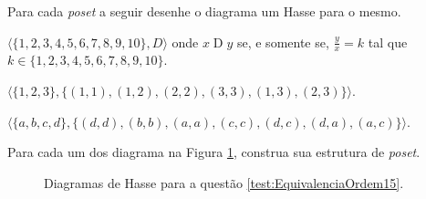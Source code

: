 \begin{questao}\label{test:EquivalenciaOrdem15}
	Para cada \textit{poset} a seguir desenhe o diagrama um Hasse para o mesmo.
\end{questao}

\begin{exerList}
	\item $\langle \{1, 2, 3, 4, 5, 6, 7, 8, 9, 10\}, D\rangle$ onde $x \mathrel{D} y$ se, e somente se, $\displaystyle\frac{y}{x} = k$ tal que $k \in \{1, 2, 3, 4, 5, 6, 7, 8, 9, 10\}$.
	\item $\langle \{1, 2, 3\}, \{(1, 1), (1, 2), (2, 2), (3, 3), (1, 3), (2, 3)\} \rangle$.
	\item $\langle \{a, b, c, d\}, \{(d, d), (b, b), (a, a), (c, c), (d, c), (d, a), (a, c)\} \rangle$.
\end{exerList}

\begin{questao}\label{test:EquivalenciaOrdem16}
	Para cada um dos diagrama na Figura \ref{fig:DiagramaExercicioPoset1},   construa sua estrutura de \textit{poset}.
\end{questao}

\begin{figure}[h]
	\centering
	\quad\quad\quad %
	\caption{Diagramas de Hasse para a questão \ref{test:EquivalenciaOrdem15}.}
	\label{fig:DiagramaExercicioPoset1}
\end{figure}


